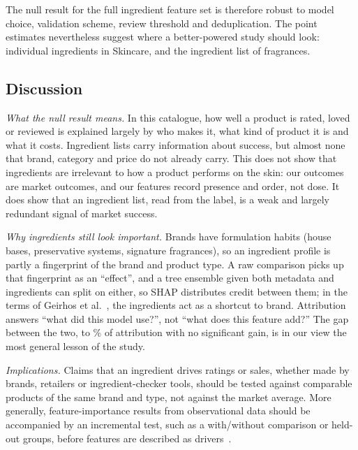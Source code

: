 \documentclass[11pt,a4paper]{article}
\begin{document}
The null result for the full ingredient feature set is therefore robust to model choice, validation scheme, review threshold and deduplication. The point estimates nevertheless suggest where a better-powered study should look: individual ingredients in Skincare, and the ingredient list of fragrances.





\subsection{Discussion}
\emph{What the null result means.} In this catalogue, how well a product is rated, loved or reviewed is explained largely by who makes it, what kind of product it is and what it costs. Ingredient lists carry information about success, but almost none that brand, category and price do not already carry. This does not show that ingredients are irrelevant to how a product performs on the skin: our outcomes are market outcomes, and our features record presence and order, not dose. It does show that an ingredient list, read from the label, is a weak and largely redundant signal of market success.

\emph{Why ingredients still look important.} Brands have formulation habits (house bases, preservative systems, signature fragrances), so an ingredient profile is partly a fingerprint of the brand and product type. A raw comparison picks up that fingerprint as an ``effect'', and a tree ensemble given both metadata and ingredients can split on either, so SHAP distributes credit between them; in the terms of Geirhos et al.~\cite{geirhos2020}, the ingredients act as a shortcut to brand. Attribution answers ``what did this model use?'', not ``what does this feature add?'' The gap between the two, \MinIngredientShare{} to \MaxIngredientShare{}\% of attribution with no significant gain, is in our view the most general lesson of the study.

\emph{Implications.} Claims that an ingredient drives ratings or sales, whether made by brands, retailers or ingredient-checker tools, should be tested against comparable products of the same brand and type, not against the market average. More generally, feature-importance results from observational data should be accompanied by an incremental test, such as a with/without comparison or held-out groups, before features are described as drivers~\cite{molnar2022}.
\end{document}
